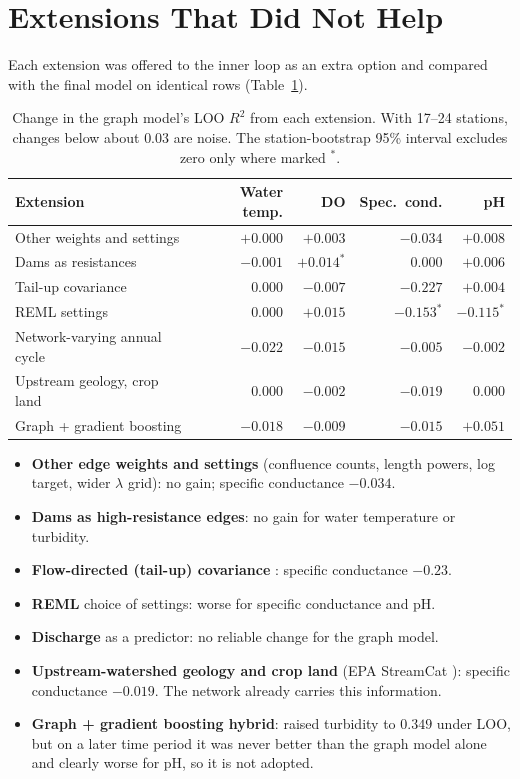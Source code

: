 \documentclass[12pt]{article}
\begin{document}
\section{Extensions That Did Not Help}

Each extension was offered to the inner loop as an extra option and compared with the final model
on identical rows (Table~\ref{tab:ext}).

\begin{table}[H]
\centering
\caption{Change in the graph model's LOO $R^2$ from each extension. With 17--24 stations,
changes below about $0.03$ are noise. The station-bootstrap 95\% interval excludes zero only where
marked $^{*}$.}
\label{tab:ext}
\begin{tabular}{l rrrr}
\toprule
Extension & Water temp. & DO & Spec.\ cond. & pH \\
\midrule
Other weights and settings & $+0.000$ & $+0.003$ & $-0.034$ & $+0.008$ \\
Dams as resistances        & $-0.001$ & $+0.014^{*}$ & $0.000$ & $+0.006$ \\
Tail-up covariance         & $0.000$  & $-0.007$ & $-0.227$ & $+0.004$ \\
REML settings              & $0.000$  & $+0.015$ & $-0.153^{*}$ & $-0.115^{*}$ \\
Network-varying annual cycle & $-0.022$ & $-0.015$ & $-0.005$ & $-0.002$ \\
Upstream geology, crop land & $0.000$ & $-0.002$ & $-0.019$ & $0.000$ \\
Graph + gradient boosting  & $-0.018$ & $-0.009$ & $-0.015$ & $+0.051$ \\
\bottomrule
\end{tabular}
\end{table}

\begin{itemize}
  \item \textbf{Other edge weights and settings} (confluence counts, length powers, log target,
        wider $\lambda$ grid): no gain; specific conductance $-0.034$.
  \item \textbf{Dams as high-resistance edges}: no gain for water temperature or turbidity.
  \item \textbf{Flow-directed (tail-up) covariance} \cite{verhoef}: specific conductance $-0.23$.
  \item \textbf{REML} choice of settings: worse for specific conductance and pH.
  \item \textbf{Discharge} as a predictor: no reliable change for the graph model.
  \item \textbf{Upstream-watershed geology and crop land} (EPA StreamCat \cite{streamcat}):
        specific conductance $-0.019$. The network already carries this information.
  \item \textbf{Graph + gradient boosting hybrid}: raised turbidity to $0.349$ under LOO, but on a
        later time period it was never better than the graph model alone and clearly worse for pH,
        so it is not adopted.
\end{itemize}
\end{document}
